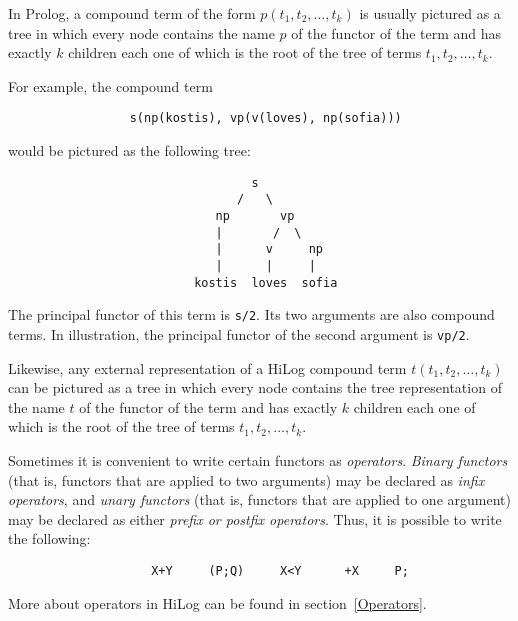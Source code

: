 In Prolog, a compound term of the form $p(t_1, t_2, \ldots, t_k)$ is usually
pictured as a tree in which every node contains the name $p$ of the functor
of the term and has exactly $k$ children each one of which is the root of the
tree of terms $t_1, t_2, \ldots, t_k$.

For example, the compound term
\begin{verbatim}
                 s(np(kostis), vp(v(loves), np(sofia)))
\end{verbatim}
would be pictured as the following tree:

\begin{minipage}{4.0in}
\begin{verbatim}
                                  s
                                /   \
                             np       vp
                             |       /  \
                             |      v     np
                             |      |     |
                          kostis  loves  sofia
\end{verbatim}
\end{minipage}

\noindent
The principal functor of this term is {\tt s/2}.  Its two arguments are also
compound terms.  In illustration, the principal functor of the second
argument is {\tt vp/2}.

Likewise, any external representation of a HiLog compound term
$t(t_1, t_2, \ldots, t_k)$ can be pictured as a tree in which every node
contains the tree representation of the name $t$ of the functor of the term
and has exactly $k$ children each one of which is the root of the tree of
terms $t_1, t_2, \ldots, t_k$.

Sometimes it is convenient to write certain functors as {\em operators}.
{\em Binary functors} (that is, functors that are applied to two arguments)
may be declared as {\em infix operators}, and {\em unary functors} (that is,
functors that are applied to one argument) may be declared as either 
{\em prefix or postfix operators}.  
Thus, it is possible to write the following:
\begin{verbatim}
                    X+Y     (P;Q)     X<Y      +X     P;
\end{verbatim}
More about operators in HiLog can be found in section~\ref{Operators}.


